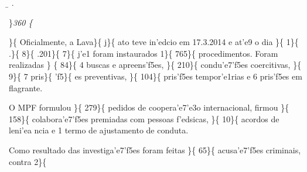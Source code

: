 \ab{} \ltrch{} \b{} .\tab 
\par \}\pard \ltrpar\qj {}\sl360\widctlpar\wrapdefault\faauto{} \{\rtlch{}
 \ltrch{}  \par \}\{\rtlch{}
 \ltrch{}  Oficialmente, a Lava\}\{\rtlch{}
 \ltrch{}  j\}\{\rtlch{}  \ltrch{}
 ato teve in'edcio em 17.3.2014 e at'e9
o dia \}\{\rtlch{}  \ltrch{}  1\}\{\rtlch{}
 \ltrch{}  .\}\{\rtlch{} 
\ltrch{}  8\}\{\rtlch{}  \ltrch{}
 .201\}\{\rtlch{}  \ltrch{}
 7\}\{\rtlch{}  \ltrch{}
 j'e1 foram instaurados 1\}\{\rtlch{}
 \ltrch{}  765\}\{\rtlch{}  \ltrch{}
 procedimentos. Foram realizadas \}
\{\rtlch{}  \ltrch{}  84\}\{\rtlch{} 
\ltrch{}  4 buscas e apreens'f5es,
\}\{\rtlch{}  \ltrch{}  210\}\{\rtlch{} 
\ltrch{}  condu'e7'f5es coercitivas,
\}\{\rtlch{}  \ltrch{}  9\}\{\rtlch{} 
\ltrch{}  7 pris\}\{\rtlch{} 
\ltrch{}  'f5\}\{\rtlch{}  \ltrch{}
 es preventivas, \}\{\rtlch{} 
\ltrch{}  104\}\{\rtlch{}  \ltrch{}
 pris'f5es tempor'e1rias e 6 pris'f5es
em flagrante. \par O MPF formulou \}\{\rtlch{}  \ltrch{}
 279\}\{\rtlch{}  \ltrch{}
 pedidos de coopera'e7'e3o
internacional, firmou \}\{\rtlch{}  \ltrch{} 
158\}\{\rtlch{}  \ltrch{} 
colabora'e7'f5es premiadas com pessoas f'edsicas, \}\{\rtlch{} 
\ltrch{}  10\}\{\rtlch{}  \ltrch{}
 acordos de leni'ea ncia e 1 termo de
ajustamento de conduta. \par Como resultado das investiga'e7'f5es foram
feitas \}\{\rtlch{}  \ltrch{} 
65\}\{\rtlch{}  \ltrch{} 
acusa'e7'f5es criminais, contra 2\}\{\rtlch{}  \ltrch{}
